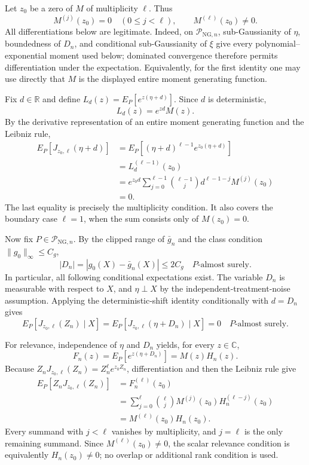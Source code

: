 Let \(z_0\) be a zero of \(M\) of multiplicity \(\ell\).  Thus
\[
M^{(j)}(z_0)=0\quad(0\le j<\ell),
\qquad
M^{(\ell)}(z_0)\ne0.
\]
All differentiations below are legitimate.  Indeed, on \(\mathcal P_{\mathrm{NG},n}\), sub-Gaussianity of \(\eta\), boundedness of \(D_n\), and conditional sub-Gaussianity of \(\xi\) give every polynomial--exponential moment used below; dominated convergence therefore permits differentiation under the expectation.  Equivalently, for the first identity one may use directly that \(M\) is the displayed entire moment generating function.

Fix \(d\in\mathbb R\) and define \(L_d(z)=E_P[e^{z(\eta+d)}]\).  Since \(d\) is deterministic,
\[
L_d(z)=e^{zd}M(z).
\]
By the derivative representation of an entire moment generating function and the Leibniz rule,
\[
\begin{aligned}
E_P[J_{z_0,\ell}(\eta+d)]
&=E_P[(\eta+d)^{\ell-1}e^{z_0(\eta+d)}]\\
&=L_d^{(\ell-1)}(z_0)\\
&=e^{z_0d}\sum_{j=0}^{\ell-1}
  {\ell-1\choose j}d^{\ell-1-j}M^{(j)}(z_0)\\
&=0.
\end{aligned}
\]
The last equality is precisely the multiplicity condition.  It also covers the boundary case \(\ell=1\), when the sum consists only of \(M(z_0)=0\).

Now fix \(P\in\mathcal P_{\mathrm{NG},n}\).  By the clipped range of \(\bar g_n\) and the class condition \(\lVert g_0\rVert_\infty\le C_g\),
\[
|D_n|=|g_0(X)-\bar g_n(X)|\le2C_g
\quad P\text{-almost surely}.
\]
In particular, all following conditional expectations exist.  The variable \(D_n\) is measurable with respect to \(X\), and \(\eta\perp X\) by the independent-treatment-noise assumption.  Applying the deterministic-shift identity conditionally with \(d=D_n\) gives
\[
E_P[J_{z_0,\ell}(Z_n)\mid X]
=E_P[J_{z_0,\ell}(\eta+D_n)\mid X]
=0
\quad P\text{-almost surely}.
\]

For relevance, independence of \(\eta\) and \(D_n\) yields, for every \(z\in\mathbb C\),
\[
F_n(z)=E_P[e^{z(\eta+D_n)}]
=M(z)H_n(z).
\]
Because \(Z_nJ_{z_0,\ell}(Z_n)=Z_n^\ell e^{z_0Z_n}\), differentiation and then the Leibniz rule give
\[
\begin{aligned}
E_P[Z_nJ_{z_0,\ell}(Z_n)]
&=F_n^{(\ell)}(z_0)\\
&=\sum_{j=0}^{\ell}{\ell\choose j}
  M^{(j)}(z_0)H_n^{(\ell-j)}(z_0)\\
&=M^{(\ell)}(z_0)H_n(z_0).
\end{aligned}
\]
Every summand with \(j<\ell\) vanishes by multiplicity, and \(j=\ell\) is the only remaining summand.  Since \(M^{(\ell)}(z_0)\ne0\), the scalar relevance condition is equivalently \(H_n(z_0)\ne0\); no overlap or additional rank condition is used.

